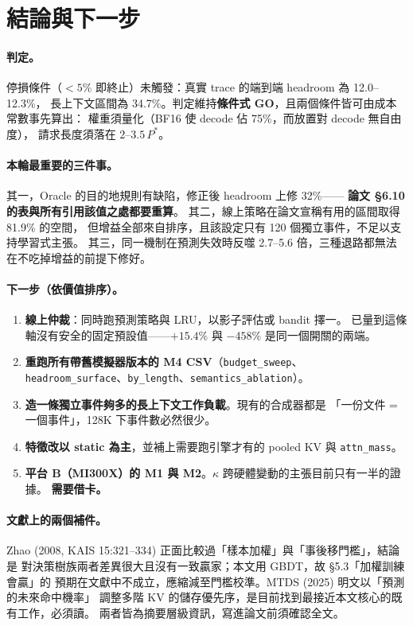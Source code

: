 \documentclass[11pt]{article}
\begin{document}
\section{結論與下一步}

\paragraph{判定。}
停損條件（$<5\%$ 即終止）未觸發：真實 trace 的端到端 headroom 為 12.0–12.3\%，
長上下文區間為 34.7\%。判定維持\textbf{條件式 GO}，且兩個條件皆可由成本常數事先算出：
權重須量化（BF16 使 decode 佔 75\%，而放置對 decode 無自由度），
請求長度須落在 $2$–$3.5\,P^{*}$。

\paragraph{本輪最重要的三件事。}
其一，Oracle 的目的地規則有缺陷，修正後 headroom 上修 32\%——
\textbf{論文 §6.10 的表與所有引用該值之處都要重算}。
其二，線上策略在論文宣稱有用的區間取得 81.9\% 的空間，
但增益全部來自排序，且該設定只有 120 個獨立事件，不足以支持學習式主張。
其三，同一機制在預測失效時反噬 2.7–5.6 倍，三種退路都無法在不吃掉增益的前提下修好。

\paragraph{下一步（依價值排序）。}
\begin{enumerate}\itemsep2pt
\item \textbf{線上仲裁}：同時跑預測策略與 LRU，以影子評估或 bandit 擇一。
  已量到這條軸沒有安全的固定預設值——$+15.4\%$ 與 $-458\%$ 是同一個開關的兩端。
\item \textbf{重跑所有帶舊模擬器版本的 M4 CSV}（\texttt{budget\_sweep}、
  \texttt{headroom\_surface}、\texttt{by\_length}、\texttt{semantics\_ablation}）。
\item \textbf{造一條獨立事件夠多的長上下文工作負載}。現有的合成器都是
  「一份文件 = 一個事件」，128K 下事件數必然很少。
\item \textbf{特徵改以 static 為主}，並補上需要跑引擎才有的 pooled KV 與 \texttt{attn\_mass}。
\item \textbf{平台 B（MI300X）的 M1 與 M2}。$\kappa$ 跨硬體變動的主張目前只有一半的證據。
  \textbf{需要借卡。}
\end{enumerate}

\paragraph{文獻上的兩個補件。}
Zhao (2008, KAIS 15:321–334) 正面比較過「樣本加權」與「事後移門檻」，結論是
對決策樹族兩者差異很大且沒有一致贏家；本文用 GBDT，故 §5.3「加權訓練會贏」的
預期在文獻中不成立，應縮減至門檻校準。MTDS (2025) 明文以「預測的未來命中機率」
調整多階 KV 的儲存優先序，是目前找到最接近本文核心的既有工作，必須讀。
兩者皆為摘要層級資訊，寫進論文前須確認全文。
\end{document}
